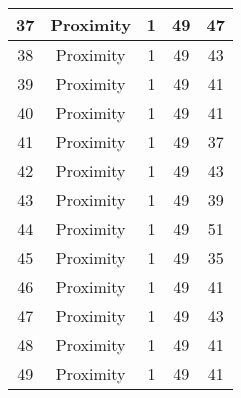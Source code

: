 \documentclass[results.tex]{subfiles}
\begin{document}
\begin{center}
\begin{tabular}{| c || c | c | c | c |}
            \hline
            37                      & Proximity                    & 1                      & 49                      & 47                   \\
            \hline
            38                      & Proximity                    & 1                      & 49                      & 43                   \\
            \hline
            39                      & Proximity                    & 1                      & 49                      & 41                   \\
            \hline
            40                      & Proximity                    & 1                      & 49                      & 41                   \\
            \hline
            41                      & Proximity                    & 1                      & 49                      & 37                   \\
            \hline
            42                      & Proximity                    & 1                      & 49                      & 43                   \\
            \hline
            43                      & Proximity                    & 1                      & 49                      & 39                   \\
            \hline
            44                      & Proximity                    & 1                      & 49                      & 51                   \\
            \hline
            45                      & Proximity                    & 1                      & 49                      & 35                   \\
            \hline
            46                      & Proximity                    & 1                      & 49                      & 41                   \\
            \hline
            47                      & Proximity                    & 1                      & 49                      & 43                   \\
            \hline
            48                      & Proximity                    & 1                      & 49                      & 41                   \\
            \hline
            49                      & Proximity                    & 1                      & 49                      & 41                   \\
            \hline
        \end{tabular}
    \end{center}
\end{document}
